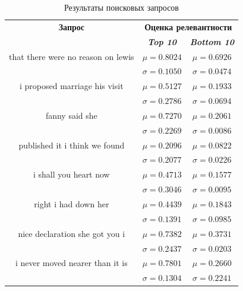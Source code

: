 \begin{table}[tbp]
    \caption{Результаты поисковых запросов}
    \begin{center}
    \begin{tabular}{ccc}
    \toprule
    \textbf{Запрос}&\multicolumn{2}{c}{\textbf{Оценка релевантности}} \\
    & \textbf{\textit{Top 10}}& \textbf{\textit{Bottom 10}} \\
    \midrule
    that there were no reason on lewis& \(\mu=0.8024\) & \(\mu=0.6926\) \\
    & \(\sigma=0.1050\) & \(\sigma=0.0474\) \\
    \midrule
    i proposed marriage his visit& \(\mu=0.5127\) & \(\mu=0.1933\) \\
    & \(\sigma=0.2786\) & \(\sigma=0.0694\) \\
    \midrule
    fanny  said she& \(\mu=0.7270\) & \(\mu=0.2061\) \\
    & \(\sigma=0.2269\) & \(\sigma=0.0086\) \\
    \midrule
    published it  i think we found& \(\mu=0.2096\) & \(\mu=0.0822\) \\
    & \(\sigma=0.2077\) & \(\sigma=0.0226\) \\
    \midrule
    i shall you heart now & \(\mu=0.4713\) & \(\mu=0.1577\) \\
    & \(\sigma=0.3046\) & \(\sigma=0.0095\) \\
    \midrule
    right i had down her & \(\mu=0.4439\) & \(\mu=0.1843\) \\
    & \(\sigma=0.1391\) & \(\sigma=0.0985\) \\
    \midrule
    nice declaration  she got you  i & \(\mu=0.7382\) & \(\mu=0.3731\) \\
    & \(\sigma=0.2437\) & \(\sigma=0.0203\) \\
    \midrule
    i never moved nearer than it is & \(\mu=0.7801\) & \(\mu=0.2660\) \\
    & \(\sigma=0.1304\) & \(\sigma=0.2241\) \\
    \bottomrule
    \end{tabular}\label{tab1}
    \end{center}
\end{table}